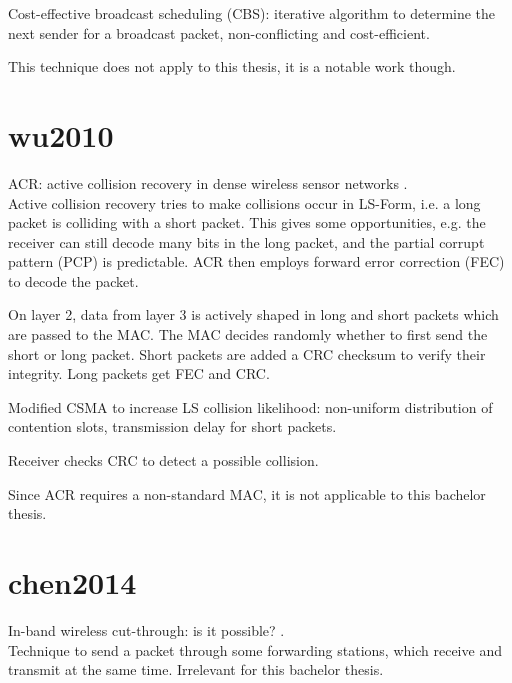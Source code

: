 Cost-effective broadcast scheduling (CBS): iterative algorithm to determine the next sender for a broadcast packet, non-conflicting and cost-efficient.

This technique does not apply to this thesis, it is a notable work though.



\section{wu2010}

ACR: active collision recovery in dense wireless sensor networks \cite{wu2010}.\\

Active collision recovery tries to make collisions occur in LS-Form, i.e. a long packet is colliding with a short packet. This gives some opportunities, e.g. the receiver can still decode many bits in the long packet, and the partial corrupt pattern (PCP) is predictable. ACR then employs forward error correction (FEC) to decode the packet.

On layer 2, data from layer 3 is actively shaped in long and short packets which are passed to the MAC. The MAC decides randomly whether to first send the short or long packet. Short packets are added a CRC checksum to verify their integrity. Long packets get FEC and CRC.

Modified CSMA to increase LS collision likelihood: non-uniform distribution of contention slots, transmission delay for short packets.

Receiver checks CRC to detect a possible collision.

Since ACR requires a non-standard MAC, it is not applicable to this bachelor thesis.



\section{chen2014}

In-band wireless cut-through: is it possible? \cite{chen2014}.\\

Technique to send a packet through some forwarding stations, which receive and transmit at the same time. Irrelevant for this bachelor thesis.


